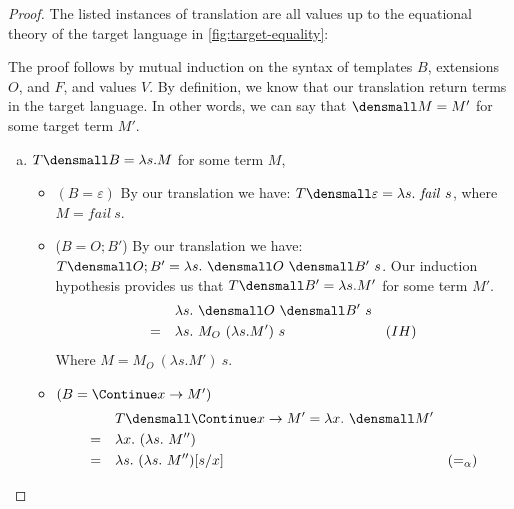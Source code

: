 \allowdisplaybreaks




\thmvaluetranslation*
\begin{proof}
    The listed instances of translation are all values up to the equational theory of the target language in \cref{fig:target-equality}:

    The proof follows by mutual induction on the syntax of templates $B$, extensions $O$, and $F$, and values $V$.
    By definition, we know that our translation return terms in the target language.
    In other words, we can say that $\den{M}=M'$ for some target term $M'$.
    \begin{enumerate}[(a)]
        \item $T\den{B} = \lambda s. M$ for some term $M$,
            \begin{itemize}
                \item $(B = \varepsilon)$ By our translation we have: $T\den{\varepsilon} = \lambda s. ~\mathit{fail} ~s$, where $M=\mathit{fail} ~s$.
                \item ($B = O; B'$) By our translation we have: $T\den{O; B'} = \lambda s. ~\den{O} ~\den{B'} ~s$.
                    Our induction hypothesis provides us that $T\den{B'} = \lambda s. M'$ for some term $M'$.
                    \begin{align*}
                        & \quad \lambda s. ~\den{O} ~\den{B'} ~s \\
                        =& \quad \lambda s. ~M_O ~(\lambda s. M') ~s & (IH)
                    \end{align*}
                    Where $M=M_O ~(\lambda s. M') ~s$.
                \item $(B = \Continue x \to M')$ 
                    \begin{align*}
                        & \quad T\den{\Continue x \to M'} = \lambda x. ~\den{M'} \\
                        =& \quad \lambda x. ~(\lambda s. ~M'') \\
                        =& \quad \lambda s. ~(\lambda s. ~M'') \subst{x}{s} & (=_{\alpha})

\end{align*}
\end{itemize}
\end{enumerate}
\end{proof}
